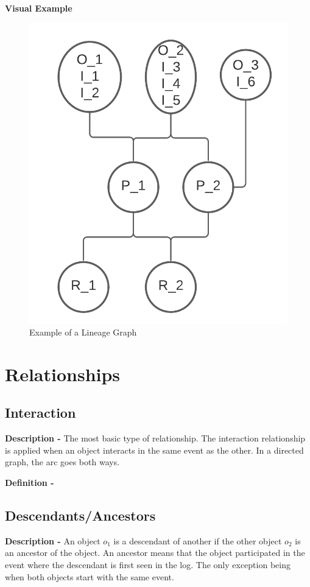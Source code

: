 \documentclass{article}
\begin{document}
\noindent\textbf{Visual Example}
\begin{figure}[h]
	\centering
	\includegraphics[scale=0.8]{images/lineage.png}
	\caption{Example of a Lineage Graph}
	\label{fig:lineage}
\end{figure}

\section{Relationships}
\subsection{Interaction}
\noindent\textbf{Description -} The most basic type of relationship. The interaction relationship is applied when an object interacts in the same event as the other. In a directed graph, the arc goes both ways.

\noindent\textbf{Definition -}
\subsection{Descendants/Ancestors}
\noindent\textbf{Description -} An object $o_1$ is a descendant of another if the other object $o_2$ is an ancestor of the object. An ancestor means that the object participated in the event where the descendant is first seen in the log. The only exception being when both objects start with the same event. 
\end{document}
